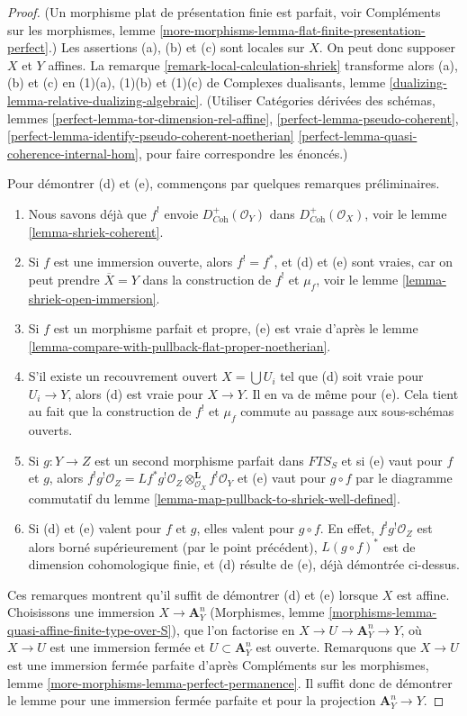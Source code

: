 \begin{proof}
(Un morphisme plat de présentation finie est parfait, voir Compléments sur les morphismes, lemme \ref{more-morphisms-lemma-flat-finite-presentation-perfect}.) Les assertions (a), (b) et (c) sont locales sur $X$. On peut donc supposer $X$ et $Y$ affines. La remarque \ref{remark-local-calculation-shriek} transforme alors (a), (b) et (c) en (1)(a), (1)(b) et (1)(c) de Complexes dualisants, lemme \ref{dualizing-lemma-relative-dualizing-algebraic}. (Utiliser Catégories dérivées des schémas, lemmes \ref{perfect-lemma-tor-dimension-rel-affine}, \ref{perfect-lemma-pseudo-coherent}, \ref{perfect-lemma-identify-pseudo-coherent-noetherian} \ref{perfect-lemma-quasi-coherence-internal-hom}, pour faire correspondre les énoncés.)

\medskip\noindent
Pour démontrer (d) et (e), commençons par quelques remarques préliminaires.
\begin{enumerate}
\item Nous savons déjà que $f^!$ envoie $D_{\textit{Coh}}^+(\mathcal{O}_Y)$ dans $D_{\textit{Coh}}^+(\mathcal{O}_X)$, voir le lemme \ref{lemma-shriek-coherent}.
\item Si $f$ est une immersion ouverte, alors $f^! = f^*$, et (d) et (e) sont vraies, car on peut prendre $\overline{X} = Y$ dans la construction de $f^!$ et $\mu_f$, voir le lemme \ref{lemma-shriek-open-immersion}.
\item Si $f$ est un morphisme parfait et propre, (e) est vraie d'après le lemme \ref{lemma-compare-with-pullback-flat-proper-noetherian}.
\item S'il existe un recouvrement ouvert $X = \bigcup U_i$ tel que (d) soit vraie pour $U_i \to Y$, alors (d) est vraie pour $X \to Y$. Il en va de même pour (e). Cela tient au fait que la construction de $f^!$ et $\mu_f$ commute au passage aux sous-schémas ouverts.
\item Si $g : Y \to Z$ est un second morphisme parfait dans $\textit{FTS}_S$ et si (e) vaut pour $f$ et $g$, alors
$f^!g^!\mathcal{O}_Z =
Lf^*g^!\mathcal{O}_Z \otimes_{\mathcal{O}_X}^\mathbf{L} f^!\mathcal{O}_Y$
et (e) vaut pour $g \circ f$ par le diagramme commutatif du lemme \ref{lemma-map-pullback-to-shriek-well-defined}.
\item Si (d) et (e) valent pour $f$ et $g$, elles valent pour $g \circ f$. En effet, $f^!g^!\mathcal{O}_Z$ est alors borné supérieurement (par le point précédent), $L(g \circ f)^*$ est de dimension cohomologique finie, et (d) résulte de (e), déjà démontrée ci-dessus.
\end{enumerate}
Ces remarques montrent qu'il suffit de démontrer (d) et (e) lorsque $X$ est affine. Choisissons une immersion $X \to \mathbf{A}^n_Y$ (Morphismes, lemme \ref{morphisms-lemma-quasi-affine-finite-type-over-S}), que l'on factorise en $X \to U \to \mathbf{A}^n_Y \to Y$, où $X \to U$ est une immersion fermée et $U \subset \mathbf{A}^n_Y$ est ouverte. Remarquons que $X \to U$ est une immersion fermée parfaite d'après Compléments sur les morphismes, lemme \ref{more-morphisms-lemma-perfect-permanence}. Il suffit donc de démontrer le lemme pour une immersion fermée parfaite et pour la projection $\mathbf{A}^n_Y \to Y$.


\end{proof}

